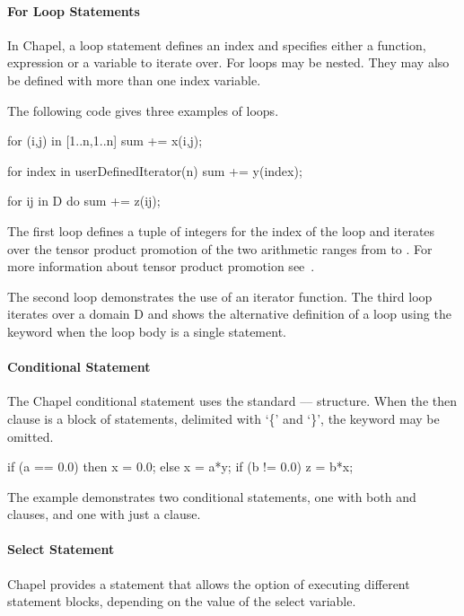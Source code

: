 \paragraph{For Loop Statements} 
In Chapel, a  loop statement defines an index and
specifies either a function, expression or a variable to
iterate over.  For loops may be nested.  They
may also be defined with more than one index variable.

\begin{example}
The following code gives three examples of  loops. 
\begin{chapel}
for (i,j) in [1..n,1..n] {
  sum += x(i,j);
}

for index in userDefinedIterator(n) {
  sum += y(index);
}

for ij in D do sum += z(ij);
\end{chapel}
The first  loop defines a tuple of integers for the
index of the loop and iterates over the tensor product promotion
of the two arithmetic ranges from  to .  For
more information about tensor product promotion 
see~.   

The second  loop demonstrates the use of 
an iterator function.  The third  loop iterates over a
domain D and shows the alternative definition of a  loop
using the  keyword when the loop body is a single statement.
\end{example}

\paragraph{Conditional Statement} 
The Chapel conditional statement uses the standard
---- structure.  When
the then clause is a block of statements, delimited with
`\{' and `\}', the  keyword may be omitted.

\begin{example}
\begin{chapel}
if (a == 0.0) then 
  x = 0.0;
else 
  x = a*y;
if (b != 0.0) {
  z = b*x;
}
\end{chapel}
The example demonstrates two conditional statements, one with
both  and  clauses, and one with just a
 clause.
\end{example}

\paragraph{Select Statement} 
Chapel provides a  statement that allows the option of
executing different statement blocks, depending on the value of the
select variable.

